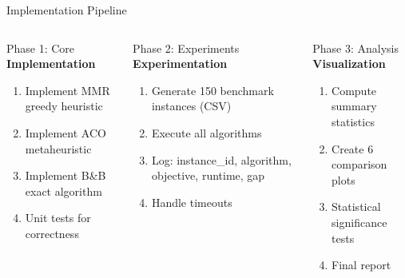 \documentclass[aspectratio=43,8pt]{beamer}
\begin{document}
\begin{frame}{Implementation Pipeline}
\begin{columns}[t]
\begin{block}{Phase 1: Core}
\textbf{Implementation}
\begin{enumerate}
    \item Implement MMR greedy heuristic
    \item Implement ACO metaheuristic
    \item Implement B\&B exact algorithm
    \item Unit tests for correctness
\end{enumerate}
\end{block}

\begin{alertblock}{Phase 2: Experiments}
\textbf{Experimentation}
\begin{enumerate}
    \item Generate 150 benchmark instances (CSV)
    \item Execute all algorithms
    \item Log: instance\_id, algorithm, objective, runtime, gap
    \item Handle timeouts
\end{enumerate}
\end{alertblock}

\begin{exampleblock}{Phase 3: Analysis}
\textbf{Visualization}
\begin{enumerate}
    \item Compute summary statistics
    \item Create 6 comparison plots
    \item Statistical significance tests
    \item Final report
\end{enumerate}
\end{exampleblock}
\end{columns}

\vspace{0.3cm}
\begin{center}
\end{center}
\end{frame}
\end{document}
